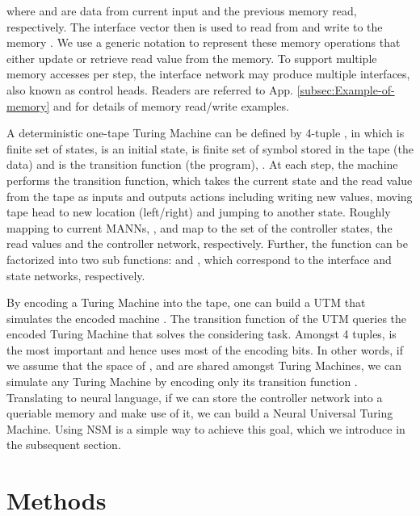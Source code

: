 \documentclass[english]{article}
\renewcommand{\cite}{\citep}
\begin{document}
\begin{minipage}[t]{0.5\textwidth}
\end{minipage}\begin{minipage}[t]{0.5\textwidth}
\end{minipage}

where  and  are data from current input and the
previous memory read, respectively. The interface vector 
then is used to read from and write to the memory . We
use a generic notation  to
represent these memory operations that either update or retrieve read
value  from the memory. To support multiple memory accesses
per step, the interface network may produce multiple interfaces, also
known as control heads. Readers are referred to App. \ref{subsec:Example-of-memory}
and \citet{graves2014neural,graves2016hybrid,santoro2016meta} for
details of memory read/write examples. 

A deterministic one-tape Turing Machine can be defined by 4-tuple
, in which  is finite set
of states,  is an initial state,  is finite
set of symbol stored in the tape (the data) and  is the transition
function (the program), .
At each step, the machine performs the transition function, which
takes the current state and the read value from the tape as inputs
and outputs actions including writing new values, moving tape head
to new location (left/right) and jumping to another state. Roughly
mapping to current MANNs, ,  and  map to the
set of the controller states, the read values and the controller network,
respectively. Further, the function  can be factorized into
two sub functions: 
and , which correspond to the interface
and state networks, respectively. 

By encoding a Turing Machine into the tape, one can build a UTM that
simulates the encoded machine \cite{turing1936}. The transition function
 of the UTM queries the encoded Turing Machine that solves
the considering task. Amongst 4 tuples,  is the most important
and hence uses most of the encoding bits. In other words, if we assume
that the space of ,  and  are shared amongst
Turing Machines, we can simulate any Turing Machine by encoding only
its transition function . Translating to neural language,
if we can store the controller network into a queriable memory and
make use of it, we can build a Neural Universal Turing Machine. Using
NSM is a simple way to achieve this goal, which we introduce in the
subsequent section.
 
\section{Methods}
\end{document}
